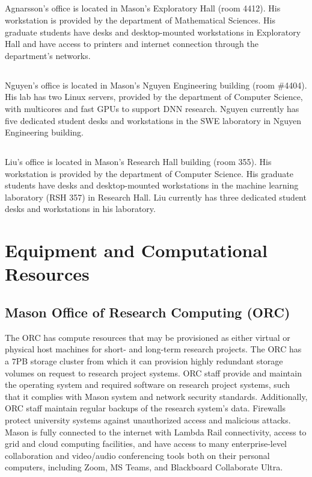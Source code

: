 \documentclass[11pt]{article}
\newcommand{\alert}[1]{{\color{blue}{#1}}}
\begin{document}
\subsection*{\alert{Agnarsson Lab}} Agnarsson's office is located in Mason's Exploratory Hall (room 4412). His workstation is provided by the department of Mathematical Sciences. His graduate students have desks and desktop-mounted workstations in Exploratory Hall and have access to printers and internet connection through the department’s networks.

\subsection*{\alert{Nguyen Lab}} Nguyen's office is located in Mason's Nguyen Engineering building (room \#4404). His lab has two Linux servers, provided by the department of Computer Science, with multicores and fast GPUs to support DNN research. Nguyen currently has five dedicated student desks and workstations in the SWE laboratory in Nguyen Engineering building.

\subsection*{\alert{Liu Lab}} Liu's office is located in Mason's Research Hall building (room 355). His workstation is provided by the department of Computer Science. His graduate students have desks and desktop-mounted workstations in the machine learning laboratory (RSH 357) in Research Hall. Liu currently has three dedicated student desks and workstations in his laboratory.


\section*{Equipment and Computational Resources}

\subsection*{Mason Office of Research Computing (ORC)} The ORC has compute resources that may be provisioned as either virtual or physical host machines for short- and long-term research projects. The ORC has a $7$PB storage cluster from which it can provision highly redundant storage volumes on request to research project systems. ORC staff provide and maintain the operating system and required software on research project systems, such that it complies with Mason system and network security standards. Additionally, ORC staff maintain regular backups of the research system’s data. Firewalls protect university systems against unauthorized access and malicious attacks. Mason is fully connected to the internet with Lambda Rail connectivity, access to grid and cloud computing facilities, and have access to many enterprise-level collaboration and video/audio conferencing tools both on their personal computers, including Zoom, MS Teams, and Blackboard Collaborate Ultra. 	
\end{document}
